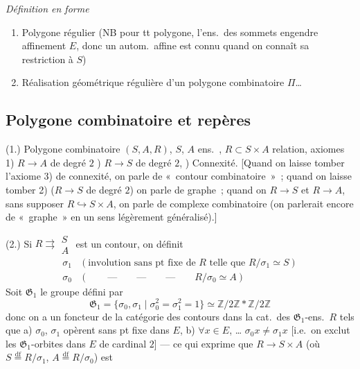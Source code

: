 \documentclass[11pt,a4paper]{article}
\begin{document}
\emph{Définition en forme}
\begin{enumerate}
  \item[1)] Polygone régulier (NB pour tt polygone, l'ens.\ des sommets engendre affinement $E$, donc un autom.\ affine est connu quand on connaît sa restriction à $S$)
  \item[2)] Réalisation géométrique régulière d'un polygone combinatoire $\Pi$…
\end{enumerate}

\subsection{Polygone combinatoire et repères}

(1.) Polygone combinatoire $(S,A,R)$, $S$, $A$ ens.\ , $R \subset S \times A$  relation, axiomes 1) $R \to A$ de degré $2$ ) $R \to S$ de degré $2$, ) Connexité. [Quand on laisse tomber l'axiome 3) de connexité, on parle de «~contour combinatoire~»~; quand on laisse tomber  2) ($R \to S$ de degré $2$) on parle de graphe~; quand on   $R \to S$ et $R \to A$, sans supposer $R \hookrightarrow S \times A$, on parle de  complexe   combinatoire (on parlerait encore de «~graphe~» en un sens légèrement généralisé).]

(2.) Si $R \rightrightarrows \begin{smallmatrix} S \\ A \end{smallmatrix}$ est un contour, on définit
\[
  \begin{array}{ll}
    \sigma_1 & (\text{involution sans pt fixe de } R \text{ telle que } R/\sigma_1 \simeq S) \\
    \sigma_0 & (\qquad\text{---}\qquad\text{---}\qquad\text{---}\qquad R/\sigma_0 \simeq A)
  \end{array}
\]
Soit $\mathfrak{G}_1$ le groupe défini par
\[
  \mathfrak{G}_1 = \{\sigma_0,\sigma_1 \mid \sigma_0^{2} = \sigma_1^{2} = 1\} \simeq \mathbb{Z}/2\mathbb{Z} * \mathbb{Z}/2\mathbb{Z}
\]
donc on a un foncteur \ill{} de la catégorie des contours dans la cat.\ des $\mathfrak{G}_1$-ens.\ $R$ tels que
a) $\sigma_0$, $\sigma_1$ opèrent sans pt fixe dans $E$,
b) $\forall x \in E$, … $\sigma_0 x \neq \sigma_1 x$ [i.e.\ on exclut les $\mathfrak{G}_1$-orbites dans $E$ \ill{} de cardinal $2$] --- ce qui exprime que $R \to S \times A$ (où $S \overset{\mathrm{df}}{=} R/\sigma_1$, $A \overset{\mathrm{df}}{=} R/\sigma_0$) est
\end{document}
